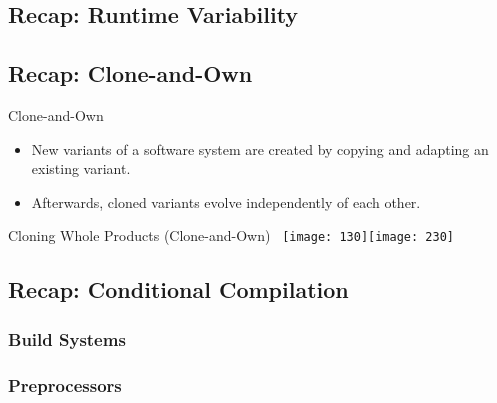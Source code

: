 \subsection{Recap: Runtime Variability}

\subsection{Recap: Clone-and-Own}
\begin{frame}{\myframetitle}
	\begin{mycolumns}[animation=none]
		\begin{definition}{Clone-and-Own}
			\begin{itemize}
				\item New variants of a software system are created by copying and adapting an existing variant.
				\item Afterwards, cloned variants evolve independently of each other.
			\end{itemize}	
		\end{definition}	
		\vspace{3mm}		
		\begin{example}{Cloning Whole Products (Clone-and-Own)}
			~\hfill\texttt{[image: 130]}\hfill\texttt{[image: 230]}\hfill~
		\end{example}
	\mynextcolumn
	\end{mycolumns}
\end{frame}

\subsection{Recap: Conditional Compilation}

\subsubsection*{Build Systems}

\subsubsection*{Preprocessors}

